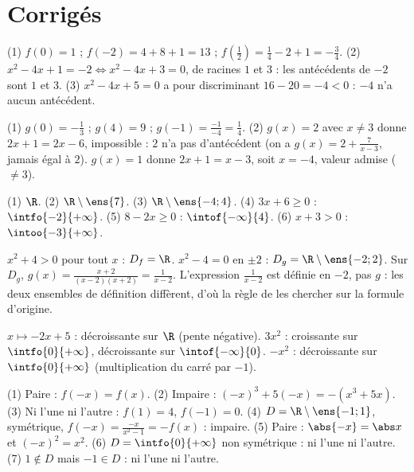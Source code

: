 \section{Corrigés}
\begin{solution}
(1) $f(0)=1$ ; $f(-2)=4+8+1=13$ ; $f(\frac12)=\frac14-2+1=-\frac34$. (2) $x^2-4x+1=-2\iff x^2-4x+3=0$, de racines $1$ et $3$ : les antécédents de $-2$ sont $1$ et $3$. (3) $x^2-4x+5=0$ a pour discriminant $16-20=-4<0$ : $-4$ n'a aucun antécédent.
\end{solution}
\begin{solution}
(1) $g(0)=-\frac13$ ; $g(4)=9$ ; $g(-1)=\frac{-1}{-4}=\frac14$. (2) $g(x)=2$ avec $x\ne3$ donne $2x+1=2x-6$, impossible : $2$ n'a pas d'antécédent (on a $g(x)=2+\frac{7}{x-3}$, jamais égal à $2$). $g(x)=1$ donne $2x+1=x-3$, soit $x=-4$, valeur admise ($\ne3$).
\end{solution}
\begin{solution}
(1) $\R$. (2) $\R\setminus\ens{7}$. (3) $\R\setminus\ens{-4;4}$. (4) $3x+6\ge0$ : $\intfo{-2}{+\infty}$. (5) $8-2x\ge0$ : $\intof{-\infty}{4}$. (6) $x+3>0$ : $\intoo{-3}{+\infty}$.
\end{solution}
\begin{solution}
$x^2+4>0$ pour tout $x$ : $D_f=\R$. $x^2-4=0$ en $\pm2$ : $D_g=\R\setminus\ens{-2;2}$. Sur $D_g$, $g(x)=\frac{x+2}{(x-2)(x+2)}=\frac{1}{x-2}$. L'expression $\frac{1}{x-2}$ est définie en $-2$, pas $g$ : les deux ensembles de définition diffèrent, d'où la règle de les chercher sur la formule d'origine.
\end{solution}
\begin{solution}
$x\mapsto-2x+5$ : décroissante sur $\R$ (pente négative). $3x^2$ : croissante sur $\intfo{0}{+\infty}$, décroissante sur $\intof{-\infty}{0}$. $-x^2$ : décroissante sur $\intfo{0}{+\infty}$ (multiplication du carré par $-1$).
\end{solution}
\begin{solution}
(1) Paire : $f(-x)=f(x)$. (2) Impaire : $(-x)^3+5(-x)=-(x^3+5x)$. (3) Ni l'une ni l'autre : $f(1)=4$, $f(-1)=0$. (4) $D=\R\setminus\ens{-1;1}$, symétrique, $f(-x)=\frac{-x}{x^2-1}=-f(x)$ : impaire. (5) Paire : $\abs{-x}=\abs x$ et $(-x)^2=x^2$. (6) $D=\intfo{0}{+\infty}$ non symétrique : ni l'une ni l'autre. (7) $1\notin D$ mais $-1\in D$ : ni l'une ni l'autre.
\end{solution}

